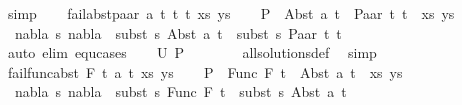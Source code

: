 \begin{isabellebody}
\ simp\isanewline
{}\isamarkupfalse%
\isanewline
\ \ \isamarkupfalse%
\ {\isacharparenleft}{\kern0pt}fail{\isacharunderscore}{\kern0pt}abst{\isacharunderscore}{\kern0pt}paar\ a\ t\ t{}\ t{}\ xs\ ys{\isacharparenright}{\kern0pt}\isanewline
\ \ \isamarkupfalse%
\ {\isacharquery}{\kern0pt}P\ {\isacharequal}{\kern0pt}\ {\isachardoublequoteopen}{\isacharparenleft}{\kern0pt}Abst\ a\ t\ {\isasymapprox}{\isacharquery}{\kern0pt}\ Paar\ t{}\ t{}\ {\isacharhash}{\kern0pt}\ xs{\isacharcomma}{\kern0pt}\ ys{\isacharparenright}{\kern0pt}{\isachardoublequoteclose}\isanewline
\ \ \isamarkupfalse%
\ {\isachardoublequoteopen}{\isasymnexists}\ nabla\ s{\isachardot}{\kern0pt}\ nabla\ {\isasymturnstile}\ subst\ s\ {\isacharparenleft}{\kern0pt}Abst\ a\ t{\isacharparenright}{\kern0pt}\ {\isasymapprox}\ subst\ s\ {\isacharparenleft}{\kern0pt}Paar\ t{}\ t{}{\isacharparenright}{\kern0pt}{\isachardoublequoteclose}\isanewline
\ \ \ \ \ \isamarkupfalse%
\ {\isacharparenleft}{\kern0pt}auto\ elim{\isacharcolon}{\kern0pt}\ equ{\isachardot}{\kern0pt}cases{\isacharparenright}{\kern0pt}\isanewline
\ \ \isamarkupfalse%
\ {\isachardoublequoteopen}U\ {\isacharquery}{\kern0pt}P\ {\isacharequal}{\kern0pt}\ {\isacharbraceleft}{\kern0pt}{\isacharbraceright}{\kern0pt}{\isachardoublequoteclose}\isanewline
\ \ \ \ \isamarkupfalse%
\ all{\isacharunderscore}{\kern0pt}solutions{\isacharunderscore}{\kern0pt}def\ \isamarkupfalse%
\ simp\isanewline
{}\isamarkupfalse%
\isanewline
\ \ \isamarkupfalse%
\ {\isacharparenleft}{\kern0pt}fail{\isacharunderscore}{\kern0pt}func{\isacharunderscore}{\kern0pt}abst\ F\ t{}\ a\ t\ xs\ ys{\isacharparenright}{\kern0pt}\isanewline
\ \ \isamarkupfalse%
\ {\isacharquery}{\kern0pt}P\ {\isacharequal}{\kern0pt}\ {\isachardoublequoteopen}{\isacharparenleft}{\kern0pt}Func\ F\ t{}\ {\isasymapprox}{\isacharquery}{\kern0pt}\ Abst\ a\ t\ {\isacharhash}{\kern0pt}\ xs{\isacharcomma}{\kern0pt}\ ys{\isacharparenright}{\kern0pt}{\isachardoublequoteclose}\isanewline
\ \ \isamarkupfalse%
\ {\isachardoublequoteopen}{\isasymnexists}\ nabla\ s{\isachardot}{\kern0pt}\ nabla\ {\isasymturnstile}\ subst\ s\ {\isacharparenleft}{\kern0pt}Func\ F\ t{}{\isacharparenright}{\kern0pt}\ {\isasymapprox}\ subst\ s\ {\isacharparenleft}{\kern0pt}Abst\ a\ t{\isacharparenright}{\kern0pt}{\isachardoublequoteclose}\isanewline

\end{isabellebody}
